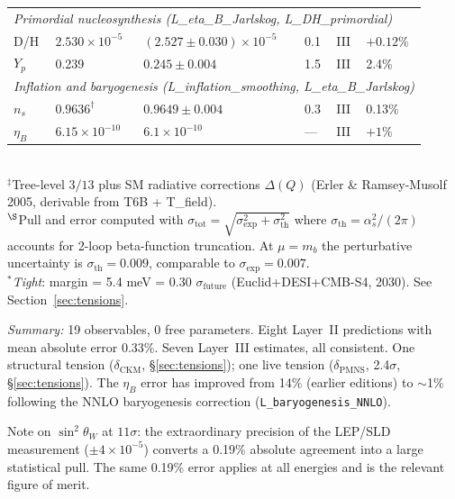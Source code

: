 \documentclass[11pt]{article}
\begin{document}
\begin{center}
\begin{tabular}{p{2.5cm}p{2.9cm}p{2.5cm}p{0.6cm}p{0.5cm}p{1cm}}
\midrule
\multicolumn{6}{l}{\textit{Primordial nucleosynthesis (L\_eta\_B\_Jarlskog, L\_DH\_primordial)}} \\
D/H & $2.530\!\times\!10^{-5}$ & $(2.527\pm0.030)\!\times\!10^{-5}$ & 0.1 & III & $+0.12\%$ \\
$Y_p$ & 0.239 & $0.245 \pm 0.004$ & 1.5 & III & 2.4\% \\
\midrule
\multicolumn{6}{l}{\textit{Inflation and baryogenesis (L\_inflation\_smoothing, L\_eta\_B\_Jarlskog)}} \\
$n_s$ & $0.9636^\dagger$ & $0.9649 \pm 0.004$ & 0.3 & III & 0.13\% \\
$\eta_B$ & $6.15\!\times\!10^{-10}$ & $6.1\!\times\!10^{-10}$ & --- & III & $+1\%$ \\
\bottomrule
\end{tabular}
\end{center}
\smallskip

\\
{\small $^\ddagger$Tree-level $3/13$ plus SM radiative corrections $\Delta(Q)$ (Erler \& Ramsey-Musolf 2005, derivable from T6B + T\_field).}\\
{\small $^\S$Pull and error computed with $\sigma_{\mathrm{tot}} = \sqrt{\sigma_{\mathrm{exp}}^2 + \sigma_{\mathrm{th}}^2}$ where $\sigma_{\mathrm{th}} = \alpha_s^2/(2\pi)$ accounts for 2-loop beta-function truncation.  At $\mu = m_b$ the perturbative uncertainty is $\sigma_{\mathrm{th}} = 0.009$, comparable to $\sigma_{\mathrm{exp}} = 0.007$.}\\
{\small $^{\ast}$\textit{Tight}: margin = 5.4 meV = 0.30 $\sigma_{\mathrm{future}}$ (Euclid+DESI+CMB-S4, 2030).  See Section~\ref{sec:tensions}.}

\smallskip
\noindent\textit{Summary:} 19 observables, 0 free parameters.  Eight Layer~II predictions with mean absolute error 0.33\%.  Seven Layer~III estimates, all consistent.  One structural tension ($\delta_{\mathrm{CKM}}$, §\ref{sec:tensions}); one live tension ($\delta_{\mathrm{PMNS}}$, 2.4$\sigma$, §\ref{sec:tensions}).  The $\eta_B$ error has improved from 14\% (earlier editions) to $\sim$1\% following the NNLO baryogenesis correction (\texttt{L\_baryogenesis\_NNLO}).

\smallskip
\noindent Note on $\sin^2\!\theta_W$ at $11\sigma$: the extraordinary precision of the LEP/SLD measurement ($\pm 4\times10^{-5}$) converts a 0.19\% absolute agreement into a large statistical pull.  The same 0.19\% error applies at all energies and is the relevant figure of merit.
\end{document}

